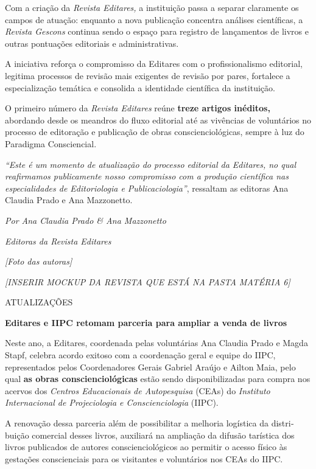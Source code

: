 Com a criação da \emph{Revista Editares,} a instituição passa a separar claramente os campos de atuação: enquanto a nova publicação concentra análises científicas, a \emph{Revista Gescons} continua sendo o espaço para registro de lançamentos de livros e outras pontuações editoriais e administrativas.

A iniciativa reforça o compromisso da Editares com o profissionalismo editorial, legitima processos de revisão mais exigentes de revisão por pares, fortalece a especialização temática e consolida a identidade científica da instituição.

O primeiro número da \emph{Revista Editares} reúne \textbf{treze artigos inéditos,} abordando desde os meandros do fluxo editorial até as vivências de voluntários no processo de editoração e publicação de obras conscienciológicas, sempre à luz do Paradigma Consciencial.

\emph{``Este é um momento de atualização do processo editorial da Editares, no qual reafirmamos publicamente nosso compromisso com a produção científica nas especialidades de Editoriologia e Publicaciologia''}, ressaltam as editoras Ana Claudia Prado e Ana Mazzonetto.

\emph{Por Ana Claudia Prado \& Ana Mazzonetto}

\emph{Editoras da Revista Editares}

\emph{{[}Foto das autoras{]}}

\emph{{[}INSERIR MOCKUP DA REVISTA QUE ESTÁ NA PASTA MATÉRIA 6{]}}

ATUALIZAÇÕES

\textbf{Editares e IIPC retomam parceria para ampliar a venda de livros}

Neste ano, a Editares, coordenada pelas voluntárias Ana Claudia Prado e Magda Stapf, celebra acordo exitoso com a coordenação geral e equipe do IIPC, representados pelos Coordenadores Gerais Gabriel Araújo e Ailton Maia, pelo qual \textbf{as obras conscienciológicas} estão sendo disponibilizadas para compra nos acervos dos \emph{Centros Educacionais de Autopesquisa} (CEAs) do \emph{Instituto Internacional de Projeciologia e Cons­cienciologia} (IIPC).

A renovação dessa parceria além de possibilitar a melhoria logística da distri­buição comercial desses livros, auxiliará na ampliação da difusão tarística dos livros pu­blicados de autores conscienciológicos ao permitir o acesso físico às gestações conscien­ciais para os visitantes e voluntários nos CEAs do IIPC.

